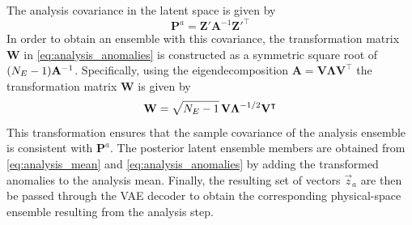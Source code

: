 %
The analysis covariance in the latent space is given by
%
\begin{equation}
\mathbf{P}^a = \mathbf{Z'} \mathbf{A}^{-1} \mathbf{Z'}^\intercal
\label{eq:analysis_covariance}
\end{equation}
%
In order to obtain an ensemble with this covariance, the transformation matrix $\mathbf{W}$ in \eqref{eq:analysis_anomalies} is constructed as a symmetric square root of $(N_E-1)\mathbf{A}^{-1}$. Specifically, using the eigendecomposition $\mathbf{A} = \mathbf{V} \mathbf{\Lambda} \mathbf{V}^\intercal$ the transformation matrix $\mathbf{W}$ is given by
%
\begin{equation}
\mathbf{W} = \sqrt{N_E-1}\, \mathbf{V} \mathbf{\Lambda}^{-1/2} \mathbf{V}^\intercal
\end{equation}
%
This transformation ensures that the sample covariance of the analysis ensemble is consistent with $\mathbf{P}^a$. The posterior latent ensemble members are obtained from \eqref{eq:analysis_mean} and \eqref{eq:analysis_anomalies} by adding the transformed anomalies to the analysis mean. Finally, the resulting set of vectors $\vec{z}_a$ are then be passed through the VAE decoder to obtain the corresponding physical-space ensemble resulting from the analysis step.
%
%
